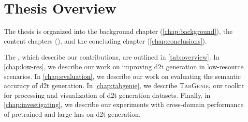 \section{Thesis Overview}
\label{sec:overview}

The thesis is organized into the background chapter (\autoref{chap:background}), the content chapters (), and the concluding chapter (\autoref{chap:conclusions}).

The , which describe our contributions, are outlined in \autoref{tab:overview}. In \autoref{chap:low-res}, we describe our work on improving \ac{d2t} generation in low-resource scenarios. In \autoref{chap:evaluation}, we describe our work on evaluating the semantic accuracy of \ac{d2t} generation. In \autoref{chap:tabgenie}, we describe \textsc{TabGenie}, our toolkit for processing and visualization of \ac{d2t} generation datasets. Finally, in \autoref{chap:investigating}, we describe our experiments with cross-domain performance of pretrained and large \acp{lm} on \ac{d2t} generation.

